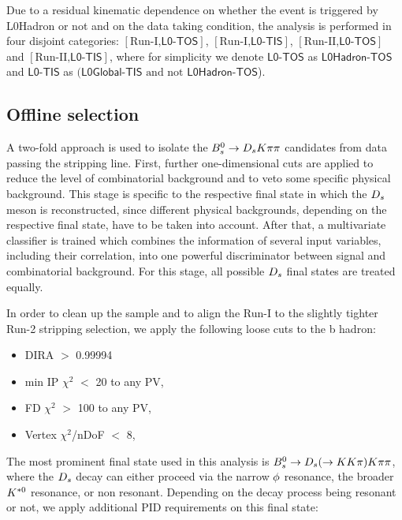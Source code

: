 Due to a residual kinematic dependence on whether the event is triggered by \textsf{L0Hadron} or not and on the data taking condition,
the analysis is performed in four disjoint categories: 
$[\text{Run-I,}\textsf{L0-TOS}]$, $[\text{Run-I,}\textsf{L0-TIS}]$, $ [\text{Run-II,}\textsf{L0-TOS}]$ and $ [\text{Run-II,}\textsf{L0-TIS}]$,
where for simplicity we denote $\textsf{L0-TOS}$ as $\textsf{L0Hadron-TOS}$ and $\textsf{L0-TIS} $ as $ (\textsf{L0Global-TIS} \text{ and not } \textsf{L0Hadron-TOS}$).
 


\subsection{Offline selection}

A two-fold approach is used to isolate the ${{B}^0_{s}}\rightarrow{\ensuremath{{D}_{s}}}{\ensuremath{K}}{\ensuremath{\pi}}{\ensuremath{\pi}}$ candidates from data passing the stripping line. 
First, further one-dimensional cuts are applied to reduce the level of combinatorial background and to veto some specific physical background. 
This stage is specific to the respective final state in which the ${{D}_{s}}$ meson is reconstructed, since different physical backgrounds, depending on the respective final state, have to be taken into account.   
After that, a multivariate classifier is trained which combines the information of several input variables, including their correlation, into one powerful discriminator
between signal and combinatorial background. For this stage, all possible ${{D}_{s}}$ final states are treated equally. 

In order to clean up the sample and to align the Run-I to the slightly tighter Run-2 stripping selection, we apply the following loose cuts to the b hadron:
\begin{itemize}
\item DIRA $>$ 0.99994
\item min IP $\chi^{2}$ $<$ 20 to any PV,
\item FD $\chi^{2}$ $>$ 100 to any PV,
\item Vertex $\chi^{2}$/nDoF $<$ 8,
\end{itemize}    

The most prominent final state used in this analysis is ${{B}^0_{s}}\rightarrow{\ensuremath{{D}_{s}}}(\rightarrow{\ensuremath{K}}{\ensuremath{K}}{\ensuremath{\pi}}){K}{\pi}{\pi}$, 
where the ${{D}_{s}}$ decay can either proceed via the narrow $\phi$ resonance, the broader ${{K}^{*0}}$ resonance, or non resonant.
Depending on the decay process being resonant or not, we apply additional PID requirements on this final state:

